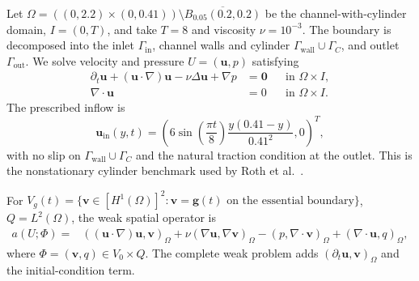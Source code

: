 Let
\(
  \Omega=((0,2.2)\times(0,0.41))\setminus\overline{B_{0.05}(0.2,0.2)}
\)
be the channel-with-cylinder domain, $I=(0,T)$, and take $T=8$ and viscosity \(\nu=10^{-3}\). The boundary is decomposed into the inlet \(\Gamma_{\mathrm{in}}\), channel walls and cylinder \(\Gamma_{\mathrm{wall}}\cup\Gamma_C\), and outlet \(\Gamma_{\mathrm{out}}\). We solve velocity and pressure \(U=(\boldsymbol u,p)\) satisfying
\begin{subequations}
\label{eq:cylinder-strong}
\begin{align}
  \partial_t\boldsymbol u+
  (\boldsymbol u\!\cdot\!\nabla)\boldsymbol u
  -\nu\Delta\boldsymbol u+\nabla p &= \boldsymbol 0
  &&\text{in }\Omega\times I,\label{eq:cylinder-momentum}\\
  \nabla\!\cdot\boldsymbol u &=0
  &&\text{in }\Omega\times I.\label{eq:cylinder-continuity}
\end{align}
\end{subequations}
The prescribed inflow is
\begin{equation}
 \boldsymbol u_{\mathrm{in}}(y,t)
 =\left(
  6\sin(\frac{\pi t}8)\frac{y(0.41-y)}{0.41^2},0
 \right)^{T},
 \label{eq:cylinder-inflow}
\end{equation}
with no slip on \(\Gamma_{\mathrm{wall}}\cup\Gamma_C\) and the natural traction condition at the outlet. This is the nonstationary cylinder benchmark used by Roth et al.~\cite{non-flow}.

For \( V_g(t)=\{\boldsymbol v\in[H^1(\Omega)]^2: \boldsymbol v=\boldsymbol g(t)\text{ on the essential boundary}\}\), \(Q=L^2(\Omega)\), 
the weak spatial operator is
\begin{align}
 a(U;\Phi)={}&
 ((\boldsymbol u\!\cdot\!\nabla)\boldsymbol u,\boldsymbol v)_\Omega
 +\nu(\nabla\boldsymbol u,\nabla\boldsymbol v)_\Omega
 -(p,\nabla\!\cdot\boldsymbol v)_\Omega
  +(\nabla\!\cdot\boldsymbol u,q)_\Omega,
 \label{eq:cylinder-spatial-operator}
\end{align}
where \(\Phi=(\boldsymbol v,q)\in V_0\times Q\). The complete weak problem adds \((\partial_t\boldsymbol u,\boldsymbol v)_\Omega\) and the initial-condition term.

